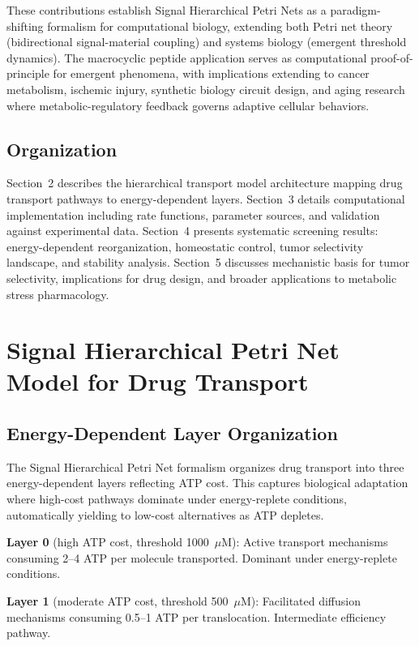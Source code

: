 \documentclass[10pt,letterpaper]{article}
\begin{document}
These contributions establish Signal Hierarchical Petri Nets as a paradigm-shifting formalism for computational biology, extending both Petri net theory (bidirectional signal-material coupling) and systems biology (emergent threshold dynamics). The macrocyclic peptide application serves as computational proof-of-principle for emergent phenomena, with implications extending to cancer metabolism, ischemic injury, synthetic biology circuit design, and aging research where metabolic-regulatory feedback governs adaptive cellular behaviors.

\subsection{Organization}

Section~2 describes the hierarchical transport model architecture mapping drug transport pathways to energy-dependent layers. Section~3 details computational implementation including rate functions, parameter sources, and validation against experimental data. Section~4 presents systematic screening results: energy-dependent reorganization, homeostatic control, tumor selectivity landscape, and stability analysis. Section~5 discusses mechanistic basis for tumor selectivity, implications for drug design, and broader applications to metabolic stress pharmacology.

\section{Signal Hierarchical Petri Net Model for Drug Transport}

\subsection{Energy-Dependent Layer Organization}

The Signal Hierarchical Petri Net formalism organizes drug transport into three energy-dependent layers reflecting ATP cost. This captures biological adaptation where high-cost pathways dominate under energy-replete conditions, automatically yielding to low-cost alternatives as ATP depletes.

\textbf{Layer 0} (high ATP cost, threshold 1000~$\mu$M): Active transport mechanisms consuming 2--4 ATP per molecule transported. Dominant under energy-replete conditions.

\textbf{Layer 1} (moderate ATP cost, threshold 500~$\mu$M): Facilitated diffusion mechanisms consuming 0.5--1 ATP per translocation. Intermediate efficiency pathway.
\end{document}
